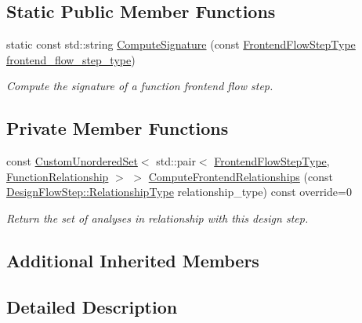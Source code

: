 \subsection*{Static Public Member Functions}
\begin{DoxyCompactItemize}
\item 
static const std\+::string \hyperlink{classApplicationFrontendFlowStep_a7f1afef6aec290f5a48b7a65716722be}{Compute\+Signature} (const \hyperlink{frontend__flow__step_8hpp_afeb3716c693d2b2e4ed3e6d04c3b63bb}{Frontend\+Flow\+Step\+Type} \hyperlink{classFrontendFlowStep_ad49067d6a17119d47316149ab757b60d}{frontend\+\_\+flow\+\_\+step\+\_\+type})
\begin{DoxyCompactList}\small\item\em Compute the signature of a function frontend flow step. \end{DoxyCompactList}\end{DoxyCompactItemize}
\subsection*{Private Member Functions}
\begin{DoxyCompactItemize}
\item 
const \hyperlink{classCustomUnorderedSet}{Custom\+Unordered\+Set}$<$ std\+::pair$<$ \hyperlink{frontend__flow__step_8hpp_afeb3716c693d2b2e4ed3e6d04c3b63bb}{Frontend\+Flow\+Step\+Type}, \hyperlink{classFrontendFlowStep_af7cf30f2023e5b99e637dc2058289ab0}{Function\+Relationship} $>$ $>$ \hyperlink{classApplicationFrontendFlowStep_ab308200c0096ccff3a1ff50e864ed61f}{Compute\+Frontend\+Relationships} (const \hyperlink{classDesignFlowStep_a723a3baf19ff2ceb77bc13e099d0b1b7}{Design\+Flow\+Step\+::\+Relationship\+Type} relationship\+\_\+type) const override=0
\begin{DoxyCompactList}\small\item\em Return the set of analyses in relationship with this design step. \end{DoxyCompactList}\end{DoxyCompactItemize}
\subsection*{Additional Inherited Members}


\subsection{Detailed Description}



